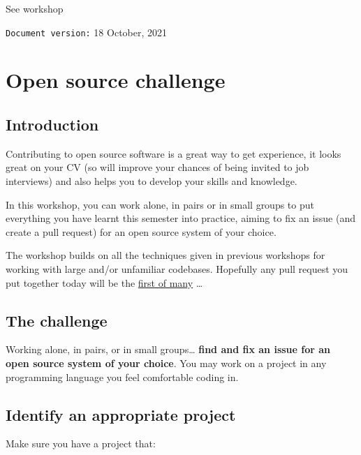 \documentclass[
]{book}
\begin{document}
See workshop

\texttt{Document\ version:} 18 October, 2021

\hypertarget{opening}{%
\chapter{Open source challenge}\label{opening}}

\hypertarget{introduction-1}{%
\section{Introduction}\label{introduction-1}}

Contributing to open source software is a great way to get experience, it looks great on your CV (so will improve your chances of being invited to job interviews) and also helps you to develop your skills and knowledge. \citep{experiencing, spinellis}

In this workshop, you can work alone, in pairs or in small groups to put everything you have learnt this semester into practice, aiming to fix an issue (and create a pull request) for an open source system of your choice.

The workshop builds on all the techniques given in previous workshops for working with large and/or unfamiliar codebases.
Hopefully any pull request you put together today will be the \href{http://firstpr.me}{first of many} \ldots{}

\hypertarget{challenge}{%
\section{The challenge}\label{challenge}}

Working alone, in pairs, or in small groups\ldots{} \textbf{find and fix an issue for an open source system of your choice}.
You may work on a project in any programming language you feel comfortable coding in.

\hypertarget{projecti}{%
\section{Identify an appropriate project}\label{projecti}}

Make sure you have a project that:
\end{document}
